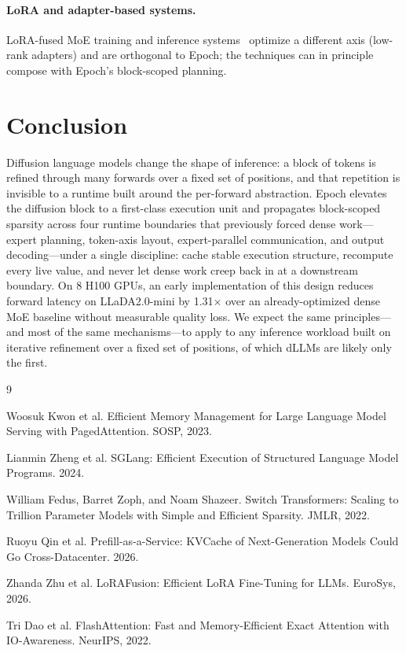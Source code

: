 \documentclass[sigconf,review,anonymous, 10pt]{acmart}
\newcommand{\sys}{Epoch}
\begin{document}
\paragraph{LoRA and adapter-based systems.}
LoRA-fused MoE training and inference systems~\cite{lorafusion} optimize a different axis (low-rank adapters) and are orthogonal to \sys{}; the techniques can in principle compose with \sys{}'s block-scoped planning.

\section{Conclusion}

Diffusion language models change the shape of inference: a block of tokens is refined through many forwards over a fixed set of positions, and that repetition is invisible to a runtime built around the per-forward abstraction.
\sys{} elevates the diffusion block to a first-class execution unit and propagates block-scoped sparsity across four runtime boundaries that previously forced dense work---expert planning, token-axis layout, expert-parallel communication, and output decoding---under a single discipline: cache stable execution structure, recompute every live value, and never let dense work creep back in at a downstream boundary.
On 8 H100 GPUs, an early implementation of this design reduces forward latency on LLaDA2.0-mini by 1.31$\times$ over an already-optimized dense MoE baseline without measurable quality loss.
We expect the same principles---and most of the same mechanisms---to apply to any inference workload built on iterative refinement over a fixed set of positions, of which dLLMs are likely only the first.

\balance

\begin{thebibliography}{9}

Woosuk Kwon et al.
Efficient Memory Management for Large Language Model Serving with PagedAttention.
SOSP, 2023.

Lianmin Zheng et al.
SGLang: Efficient Execution of Structured Language Model Programs.
2024.

William Fedus, Barret Zoph, and Noam Shazeer.
Switch Transformers: Scaling to Trillion Parameter Models with Simple and Efficient Sparsity.
JMLR, 2022.

Ruoyu Qin et al.
Prefill-as-a-Service: KVCache of Next-Generation Models Could Go Cross-Datacenter.
2026.

Zhanda Zhu et al.
LoRAFusion: Efficient LoRA Fine-Tuning for LLMs.
EuroSys, 2026.

Tri Dao et al.
FlashAttention: Fast and Memory-Efficient Exact Attention with IO-Awareness.
NeurIPS, 2022.

\end{thebibliography}
\end{document}
